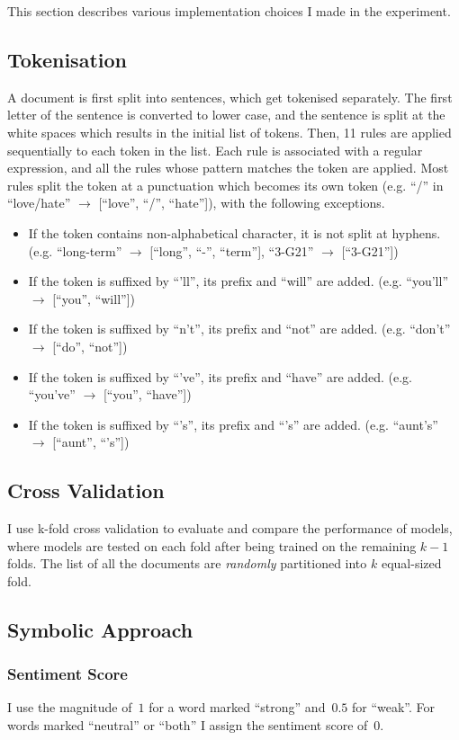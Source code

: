 This section describes various implementation choices I made in the experiment.
\subsection{Tokenisation}
\label{sec:tokenizer}
A document is first split into sentences, which get tokenised separately.
The first letter of the sentence is converted to lower case, and the sentence is split at the white spaces which results in the initial list of tokens.
Then, 11 rules are applied sequentially to each token in the list. Each rule is associated with a regular expression, and all the rules whose pattern matches the token are applied. Most rules split the token at a punctuation which becomes its own token (e.g. ``/'' in ``love/hate'' $\rightarrow$ [``love'', ``/'', ``hate'']), with the following exceptions.
\begin{itemize}
\item If the token contains non-alphabetical character, it is not split at hyphens.
(e.g. ``long-term'' $\rightarrow$ [``long'', ``-'', ``term''], ``3-G21'' $\rightarrow$ [``3-G21''])
\item If the token is suffixed by ``'ll'', its prefix and ``will'' are added.
(e.g. ``you'll'' $\rightarrow$ [``you'', ``will''])
\item If the token is suffixed by ``n't'', its prefix and ``not'' are added.
(e.g. ``don't'' $\rightarrow$ [``do'', ``not''])
\item If the token is suffixed by ``'ve'', its prefix and ``have'' are added.
(e.g. ``you've'' $\rightarrow$ [``you'', ``have''])
\item If the token is suffixed by ``'s'', its prefix and ``'s'' are added.
(e.g. ``aunt's'' $\rightarrow$ [``aunt'', ``'s''])
\end{itemize}
\subsection{Cross Validation}
I use k-fold cross validation to evaluate and compare the performance of models, where models are tested on each fold after being trained on the remaining $k-1$ folds.
The list of all the documents are {\em randomly} partitioned into $k$ equal-sized fold.
\subsection{Symbolic Approach}
\subsubsection{Sentiment Score}
I use the magnitude of~$1$ for a word marked ``strong'' and~$0.5$ for ``weak''. For words marked ``neutral'' or ``both'' I assign the sentiment score of~$0$.
